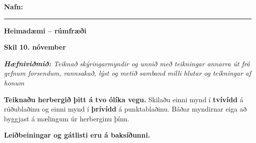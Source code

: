 \documentclass[12pt,a4paper]{article}
\newcommand{\skiladagur}{10. nóvember}
\begin{document}
\raggedright

\hfill\textbf{Nafn:}\enspace\rule{62mm}{0.4pt}

\vspace{5mm}
\begin{center}
  {\fontsize{21}{25}\selectfont\bfseries\color{titill} Heimadæmi – rúmfræði\par}
  \vspace{2mm}
  {\large\bfseries\color{skilalitur} Skil \skiladagur\par}
\end{center}

\vspace{2mm}
{\itshape\textbf{Hæfniviðmið:} Teiknað skýringarmyndir og unnið með teikningar annarra út frá gefnum forsendum, rannsakað, lýst og metið samband milli hlutar og teikningar af honum\par}

\vspace{5mm}
\textbf{Teiknaðu herbergið þitt á tvo ólíka vegu.} Skilaðu einni mynd í \textbf{tvívídd} á rúðublaðinu og einni mynd í \textbf{þrívídd} á punktablaðinu. Báðar myndirnar eiga að byggjast á mælingum úr herberginu þínu.

\vspace{3mm}
\textbf{Leiðbeiningar og gátlisti eru á baksíðunni.}
\end{document}
